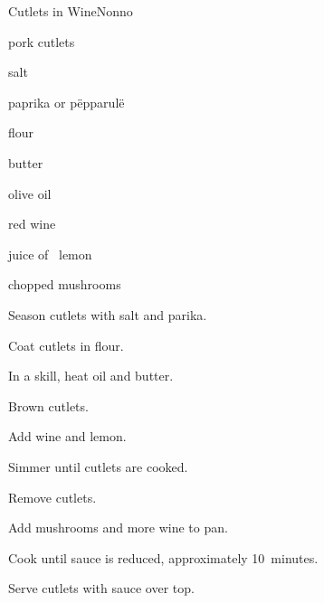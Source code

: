 \begin{recipe}{Cutlets in Wine}{Nonno}{}

\begin{ingredients}
\item pork cutlets
\item salt
\item paprika or p\"epparul\"e
\item flour
\item butter
\item olive oil
\item red wine
\item juice of \half{}~lemon
\item chopped mushrooms
\end{ingredients}

\begin{directions}
\item Season cutlets with salt and parika.
\item Coat cutlets in flour.
\item In a skill, heat oil and butter.
\item Brown cutlets.
\item Add wine and lemon.
\item Simmer until cutlets are cooked.
\item Remove cutlets.
\item Add mushrooms and more wine to pan.
\item Cook until sauce is reduced, approximately 10~minutes.
\item Serve cutlets with sauce over top.
\end{directions}

\end{recipe}
